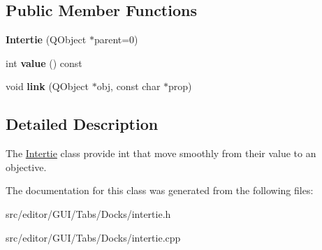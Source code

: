 \subsection*{\-Public \-Member \-Functions}
\begin{DoxyCompactItemize}
\item 
\hypertarget{class_intertie_a5db7f747092208768bc932a15c69fae9}{{\bfseries \-Intertie} (\-Q\-Object $\ast$parent=0)}\label{class_intertie_a5db7f747092208768bc932a15c69fae9}

\item 
\hypertarget{class_intertie_aa30a54fd7c685f48b7d9d178fe6cda6e}{int {\bfseries value} () const }\label{class_intertie_aa30a54fd7c685f48b7d9d178fe6cda6e}

\item 
\hypertarget{class_intertie_a86e5f0e4e5ef985586ccc7596db29c3b}{void {\bfseries link} (\-Q\-Object $\ast$obj, const char $\ast$prop)}\label{class_intertie_a86e5f0e4e5ef985586ccc7596db29c3b}

\end{DoxyCompactItemize}


\subsection{\-Detailed \-Description}
\-The \hyperlink{class_intertie}{\-Intertie} class provide int that move smoothly from their value to an objective. 

\-The documentation for this class was generated from the following files\-:\begin{DoxyCompactItemize}
\item 
src/editor/\-G\-U\-I/\-Tabs/\-Docks/intertie.\-h\item 
src/editor/\-G\-U\-I/\-Tabs/\-Docks/intertie.\-cpp\end{DoxyCompactItemize}

